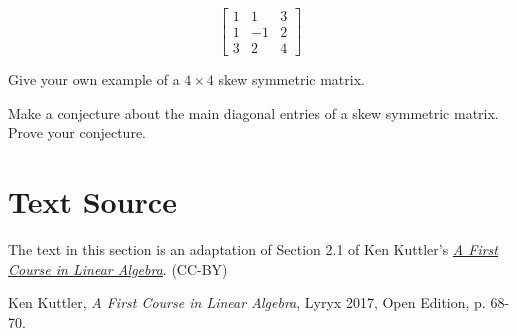 \documentclass{ximera}
\begin{document}
\begin{problem}\label{prob:symmetricclassification3}
$$\begin{bmatrix}
1 & 1 & 3\\
1 & -1 & 2\\
3 &  2 &  4
\end{bmatrix}$$
\begin{multipleChoice}
   \end{multipleChoice}
\end{problem}


\begin{problem}\label{prob:4by4symmetricex}
Give your own example of a $4\times 4$ skew symmetric matrix.
\end{problem}

\begin{problem} \label{prob:maindiagskewsymm}
Make a conjecture about the main diagonal entries of a skew symmetric matrix.  Prove your conjecture.
\end{problem}

\section*{Text Source}
The text in this section is an adaptation of Section 2.1 of Ken Kuttler's \href{https://open.umn.edu/opentextbooks/textbooks/a-first-course-in-linear-algebra-2017}{\it A First Course in Linear Algebra}. (CC-BY)

Ken Kuttler, {\it  A First Course in Linear Algebra}, Lyryx 2017, Open Edition, p. 68-70.
\end{document}
